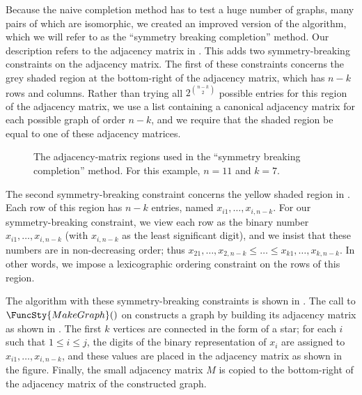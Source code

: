 Because the naive completion method has to test a huge number of graphs,
many pairs of which are isomorphic, we created an improved version of the
algorithm, which we will refer to as the ``symmetry breaking completion''
method.  Our description refers to the adjacency matrix in
.
This adds two symmetry-breaking constraints on the adjacency matrix.
The first of these constraints concerns the grey shaded region at the bottom-right
of the adjacency matrix, which has $n - k$ rows and columns.  Rather than
trying all $2^{n-k \choose 2}$ possible entries for this region of the
adjacency matrix, we use a list containing a canonical adjacency matrix
for each possible graph of order $n-k$, and we require that the shaded
region be equal to one of these adjacency matrices.

\begin{figure}[h!]
    \centering
    \footnotesize
    \caption{The adjacency-matrix regions used in the 
        ``symmetry breaking completion'' method. For this example, $n=11$ and $k=7$.}
\label{fig:regions-for-trees}
\end{figure}

The second symmetry-breaking constraint concerns the yellow shaded region
in . Each row of this region has $n-k$ entries,
named $x_{i1}, \dots, x_{i,n-k}$.  For our symmetry-breaking constraint, we
view each row as the binary number $x_{i1}, \dots, x_{i,n-k}$
(with $x_{i,n-k}$ as the least significant digit), and we insist
that these numbers are in non-decreasing order; thus
$x_{21}, \dots, x_{2,n-k} \leq \dots \leq x_{k1}, \dots, x_{k,n-k}$.
In other words, we impose a lexicographic ordering constraint
on the rows of this region.

The algorithm with these symmetry-breaking constraints is shown
in .  The call to $\FuncSty{MakeGraph}()$ on
 constructs a graph by building its
adjacency matrix as shown in .  The
first $k$ vertices are connected in the form of a star;
for each $i$ such that $1 \leq i \leq j$, the digits of the binary
representation of $x_i$
are assigned to $x_{i1}, \dots, x_{i,n-k}$, and these values
are placed in the adjacency matrix as shown in the figure.  Finally,
the small adjacency matrix $M$ is copied to the bottom-right of
the adjacency matrix of the constructed graph.

